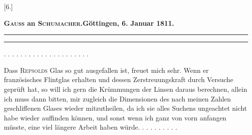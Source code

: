 \bigskip\begin{center}
[6.]\par\medskip
\textbf{\textsc{Gauss} an \textsc{Schumacher}.\quad Göttingen, 6. Januar 1811.}\par\medskip
\rule{.75\linewidth}{.4pt}\par
[Briefwechsel zwischen \textsc{Gauss} und \textsc{Schumacher} I, S. 61.]\par
\rule{.75\linewidth}{.4pt}
\end{center}
\noindent . . . . . . . . . . . . . . . . . . . . .\par
\noindent\hspace*{\parindent}Dass \textsc{Repsolds} Glas so gut ausgefallen ist, freuet mich sehr. Wenn er französisches Flintglas erhalten und dessen Zerstreuungskraft durch Versuche geprüft hat, so will ich gern die Krümmungen der Linsen daraus berechnen, allein ich muss dann bitten, mir zugleich die Dimensionen des nach meinen Zahlen geschliffenen Glases wieder mitzutheilen, da ich sie alles Suchens ungeachtet nicht habe wieder auffinden können, und sonst wenn ich ganz von vorn anfangen müsste, eine viel längere Arbeit haben würde. . . . . . . . . .
\clearpage\endgroup
